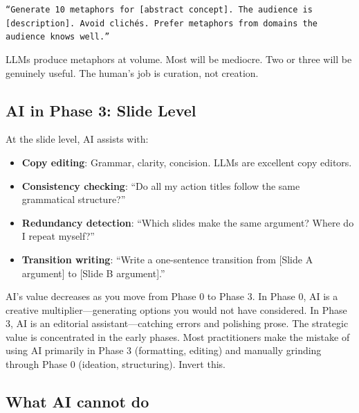 \texttt{``Generate 10 metaphors for [abstract concept]. The audience is [description]. Avoid clich\'{e}s. Prefer metaphors from domains the audience knows well.''}

LLMs produce metaphors at volume. Most will be mediocre. Two or three will be genuinely useful. The human's job is curation, not creation.

\subsection{AI in Phase 3: Slide Level}

At the slide level, AI assists with:

\begin{itemize}
  \item \textbf{Copy editing}: Grammar, clarity, concision. LLMs are excellent copy editors.
  \item \textbf{Consistency checking}: ``Do all my action titles follow the same grammatical structure?''
  \item \textbf{Redundancy detection}: ``Which slides make the same argument? Where do I repeat myself?''
  \item \textbf{Transition writing}: ``Write a one-sentence transition from [Slide A argument] to [Slide B argument].''
\end{itemize}

\begin{insightbox}
AI's value decreases as you move from Phase 0 to Phase 3. In Phase 0, AI is a creative multiplier---generating options you would not have considered. In Phase 3, AI is an editorial assistant---catching errors and polishing prose. The strategic value is concentrated in the early phases. Most practitioners make the mistake of using AI primarily in Phase 3 (formatting, editing) and manually grinding through Phase 0 (ideation, structuring). Invert this.
\end{insightbox}

\subsection{What AI cannot do}

